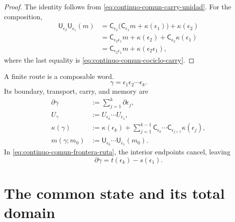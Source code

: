 \begin{proof}
The identity follows from \eqref{eq:continuo-comun-carry-unidad}.  For the
composition,
\begin{align*}
 \mathsf U_{\epsilon_2}\mathsf U_{\epsilon_1}(m)
 &=\mathsf C_{\epsilon_2}
   \bigl(\mathsf C_{\epsilon_1}m+\kappa(\epsilon_1)\bigr)
   +\kappa(\epsilon_2)\\
 &=\mathsf C_{\epsilon_2\epsilon_1}m
   +\kappa(\epsilon_2)
   +\mathsf C_{\epsilon_2}\kappa(\epsilon_1)\\
 &=\mathsf C_{\epsilon_2\epsilon_1}m
   +\kappa(\epsilon_2\epsilon_1),
\end{align*}
where the last equality is
\eqref{eq:continuo-comun-cociclo-carry}.
\end{proof}

A finite route is a composable word.
\begin{equation}
\label{eq:continuo-comun-ruta}
 \gamma=\epsilon_1\epsilon_2\cdots\epsilon_k.
\end{equation}
Its boundary, transport, carry, and memory are
\begin{align}
 \partial\gamma
 &:=\sum_{j=1}^{k}\partial\epsilon_j,
 \label{eq:continuo-comun-frontera-ruta}\\
 U_\gamma
 &:=U_{\epsilon_k}\cdots U_{\epsilon_1},
 \label{eq:continuo-comun-transporte-ruta}\\
 \kappa(\gamma)
 &:=\kappa(\epsilon_k)
   +\sum_{j=1}^{k-1}
    \mathsf C_{\epsilon_k}\cdots\mathsf C_{\epsilon_{j+1}}
    \kappa(\epsilon_j),
 \label{eq:continuo-comun-carry-ruta}\\
 m(\gamma;m_0)
 &:=\mathsf U_{\epsilon_k}\cdots
       \mathsf U_{\epsilon_1}(m_0).
 \label{eq:continuo-comun-memoria-ruta}
\end{align}
In \eqref{eq:continuo-comun-frontera-ruta}, the interior endpoints
cancel, leaving
\begin{equation}
\label{eq:continuo-comun-frontera-telescopica}
 \partial\gamma=t(\epsilon_k)-s(\epsilon_1).
\end{equation}

\section{The common state and its total domain}
\label{sec:continuo-comun-estado-total}

